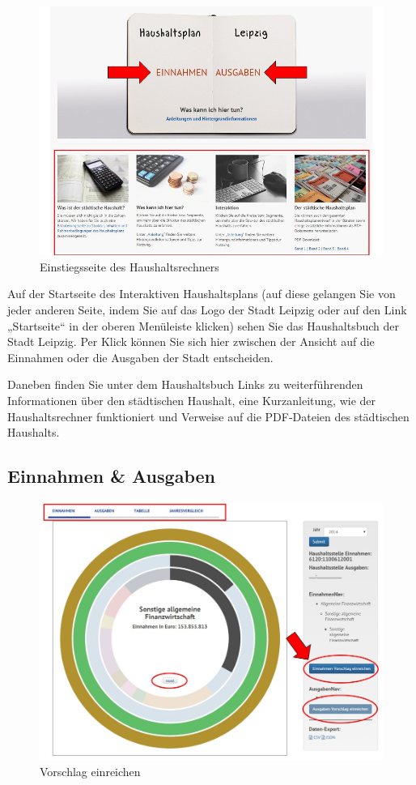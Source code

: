 \documentclass[a4paper,11pt,twoside]{article}
\begin{document}
\begin{figure}[ht]
  \begin{center}
    \includegraphics[width=.8\textwidth]{Bilder/einAus.jpg}
  \end{center}
  \caption{Einstiegsseite des Haushaltsrechners}
\end{figure}

Auf der Startseite des Interaktiven Haushaltsplans (auf diese gelangen Sie von
jeder anderen Seite, indem Sie auf das Logo der Stadt Leipzig oder auf den
Link „Startseite“ in der oberen Menüleiste klicken) sehen Sie das
Haushaltsbuch der Stadt Leipzig. Per Klick k\"onnen Sie sich hier zwischen der
Ansicht auf die Einnahmen oder die Ausgaben der Stadt entscheiden.

Daneben finden Sie unter dem Haushaltsbuch Links zu weiterführenden
Informationen über den städtischen Haushalt, eine Kurzanleitung, wie der
Haushaltsrechner funktioniert und Verweise auf die PDF-Dateien des städtischen
Haushalts.
\enlargethispage{2em}

\subsection{Einnahmen \& Ausgaben}
\begin{figure}[ht]
\begin{center}
  \includegraphics[width=\textwidth]{Bilder/piechart.jpg}
\end{center}
  \caption{Vorschlag einreichen}
\end{figure}
\end{document}
